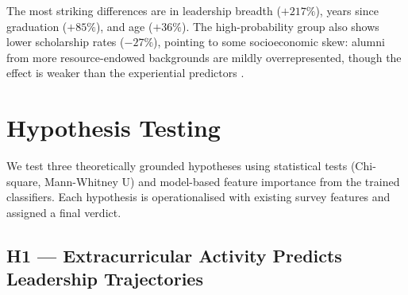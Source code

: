 \documentclass[10pt,twocolumn]{article}
\begin{document}
\begin{table}[H]
\centering
\caption{Numeric profile: high-probability founders (top decile) vs.\ rest.}
\label{tab:profile}
\end{table}

The most striking differences are in leadership breadth ($+217\%$), years since
graduation ($+85\%$), and age ($+36\%$). The high-probability group also shows
lower scholarship rates ($-27\%$), pointing to some socioeconomic skew: alumni
from more resource-endowed backgrounds are mildly overrepresented, though the
effect is weaker than the experiential predictors \cite{sullivan2021}.

\section{Hypothesis Testing}
\label{sec:hypotheses}

We test three theoretically grounded hypotheses using statistical tests
(Chi-square, Mann-Whitney U) and model-based feature importance from the
trained classifiers. Each hypothesis is operationalised with existing survey
features and assigned a final verdict.

\subsection{H1 --- Extracurricular Activity Predicts Leadership Trajectories}
\end{document}
